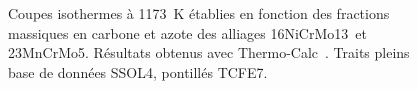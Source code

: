 \begin{figure}[!bh]
  \centering
  \hfill

  \caption{\label{fig:isothermes}Coupes isothermes à \SI{1173}{\kelvin} établies en fonction des fractions massiques en carbone et azote des alliages \protect{} 16NiCrMo13 et \protect{} 23MnCrMo5. Résultats obtenus avec Thermo-Calc~\cite{Andersson2002,Borgenstam2000}. Traits pleins base de données SSOL4, pontillés TCFE7.}
\end{figure}

